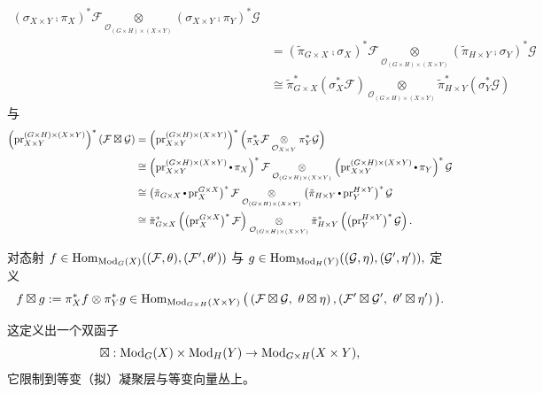 \begin{defn}[等变层的外张量积]
\begin{align*}
(\sigma_{X\times Y}\comp\pi_X)^*\mathcal{F}
\underset{\mathcal{O}_{(G\times H)\times(X\times Y)}}{\otimes}
(\sigma_{X\times Y}\comp\pi_Y)^*\mathcal{G}
\\[2mm]
&=
(\tilde{\pi}_{G\times X}\comp \sigma_X)^*\mathcal{F}
\underset{\mathcal{O}_{(G\times H)\times(X\times Y)}}{\otimes}
(\tilde{\pi}_{H\times Y}\comp \sigma_Y)^*\mathcal{G}
\\[2mm]
&\cong
\tilde{\pi}_{G\times X}^*\left(\sigma_X^*\mathcal{F}\right)
\underset{\mathcal{O}_{(G\times H)\times(X\times Y)}}{\otimes}
\tilde{\pi}_{H\times Y}^*\left(\sigma_Y^*\mathcal{G}\right)
\end{align*}
与
\begin{align*}
\left(\pr_{X\times Y}^{(G\times H)\times(X\times Y)}\right)^*
(\mathcal{F}\boxtimes\mathcal{G})
&=
\left(\pr_{X\times Y}^{(G\times H)\times(X\times Y)}\right)^*
\Big(
\pi_X^*\mathcal{F}
\underset{\mathcal{O}_{X\times Y}}{\otimes}
\pi_Y^*\mathcal{G}
\Big)
\\
&\cong
\left(\pr_{X\times Y}^{(G\times H)\times(X\times Y)}\comp\pi_X\right)^*\mathcal{F}
\underset{\mathcal{O}_{(G\times H)\times(X\times Y)}}{\otimes}
\left(\pr_{X\times Y}^{(G\times H)\times(X\times Y)}\comp\pi_Y\right)^*\mathcal{G}
\\
&\cong
\left(\tilde{\pi}_{G\times X}\comp\pr_X^{G\times X}\right)^*\mathcal{F}
\underset{\mathcal{O}_{(G\times H)\times(X\times Y)}}{\otimes}
\left(\tilde{\pi}_{H\times Y}\comp\pr_Y^{H\times Y}\right)^*\mathcal{G}
\\
&\cong
\tilde{\pi}_{G\times X}^*\left(\left(\pr_X^{G\times X}\right)^*\mathcal{F}\right)
\underset{\mathcal{O}_{(G\times H)\times(X\times Y)}}{\otimes}
\tilde{\pi}_{H\times Y}^*\left(\left(\pr_Y^{H\times Y}\right)^*\mathcal{G}\right).
\end{align*}

对态射
$
f
\in
\operatorname{\operatorname{Hom}}_{\operatorname{\mathrm{Mod}}_G(X)}
((\mathcal{F},\theta),(\mathcal{F}',\theta'))
$
与
$
g
\in
\operatorname{\operatorname{Hom}}_{\operatorname{\mathrm{Mod}}_H(Y)}
((\mathcal{G},\eta),(\mathcal{G}',\eta')),
$
定义
$$
f\boxtimes g
:=
\pi_X^*f
\otimes
\pi_Y^*g
\in
\operatorname{\operatorname{Hom}}_{\operatorname{\mathrm{Mod}}_{G\times H}(X\times Y)}
\big(
\left(
\mathcal{F}\boxtimes\mathcal{G},
\
\theta\boxtimes\eta
\right),
\left(
\mathcal{F}'\boxtimes\mathcal{G}',
\
\theta'\boxtimes\eta'
\right)
\big).
$$

这定义出一个双函子
$$
\boxtimes:
\operatorname{\mathrm{Mod}}_G(X)\times\operatorname{\mathrm{Mod}}_H(Y)
\rightarrow
\operatorname{\mathrm{Mod}}_{G\times H}(X\times Y),
$$
它限制到等变（拟）凝聚层与等变向量丛上。
\end{defn}

